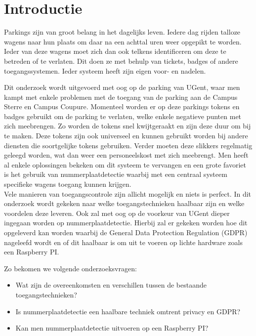 
\section{Introductie} %
\label{sec:introductie}

Parkings zijn van groot belang in het dagelijks leven. Iedere dag rijden talloze wagens naar hun plaats om daar na een achttal uren weer opgepikt te worden. Ieder van deze wagens moet zich dan ook telkens identificeren om deze te betreden of te verlaten. Dit doen ze met behulp van tickets, badges of andere toegangssystemen. Ieder systeem heeft zijn eigen voor- en nadelen.

Dit onderzoek wordt uitgevoerd met oog op de parking van UGent, waar men kampt met enkele problemen met de toegang van de parking aan de Campus Sterre en Campus Coupure. Momenteel worden er op deze parkings tokens en badges gebruikt om de parking te verlaten, welke enkele negatieve punten met zich meebrengen. Zo worden de tokens snel kwijtgeraakt en zijn deze duur om bij te maken. Deze tokens zijn ook universeel en kunnen gebruikt worden bij andere diensten die soortgelijke tokens gebruiken. Verder moeten deze slikkers regelmatig geleegd worden, wat dan weer een personeelskost met zich meebrengt. Men heeft al enkele oplossingen bekeken om dit systeem te vervangen en een grote favoriet is het gebruik van nummerplaatdetectie waarbij met een centraal systeem specifieke wagens toegang kunnen krijgen.
\\
Vele manieren van toegangscontrole zijn allicht mogelijk en niets is perfect. In dit onderzoek wordt gekeken naar welke toegangstechnieken haalbaar zijn en welke voordelen deze leveren. Ook zal met oog op de voorkeur van UGent dieper ingegaan worden op nummerplaatdetectie. Hierbij zal er gekeken worden hoe dit opgeleverd kan worden waarbij de General Data Protection Regulation (GDPR) nageleefd wordt en of dit haalbaar is om uit te voeren op lichte hardware zoals een Raspberry PI.

Zo bekomen we volgende onderzoeksvragen:
\begin{itemize}
	\item Wat zijn de overeenkomsten en verschillen tussen de bestaande toegangstechnieken?
	\item Is nummerplaatdetectie een haalbare techniek omtrent privacy en GDPR?
	\item Kan men nummerplaatdetectie uitvoeren op een Raspberry PI?
\end{itemize}

